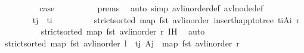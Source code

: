 \begin{isabellebody}
\ \ \ \ \ \ \isamarkupfalse%
\ \isamarkupfalse%
\ {\isacharquery}{\kern0pt}case\isanewline
\ \ \ \ \ \ \ \ \isamarkupfalse%
\ {\isachardoublequoteopen}{}{\isachardot}{\kern0pt}prems{\isachardoublequoteclose}\ \isamarkupfalse%
\ {\isacharparenleft}{\kern0pt}auto\ simp{\isacharcolon}{\kern0pt}\ avl{\isacharunderscore}{\kern0pt}inorder{\isacharunderscore}{\kern0pt}def\ avl{\isacharunderscore}{\kern0pt}node{\isacharunderscore}{\kern0pt}def{\isacharparenright}{\kern0pt}\isanewline
\ \ \ \ \isamarkupfalse%
\isanewline
\ \ \ \ \ \ \isamarkupfalse%
\ {\isachardoublequoteopen}t\isactrlsub j\ {\isacharless}{\kern0pt}\ t\isactrlsub i{\isachardoublequoteclose}\isanewline
\ \ \ \ \ \ \isamarkupfalse%
\ \isamarkupfalse%
\ {\isachardoublequoteopen}strict{\isacharunderscore}{\kern0pt}sorted\ {\isacharparenleft}{\kern0pt}map\ fst\ {\isacharparenleft}{\kern0pt}avl{\isacharunderscore}{\kern0pt}inorder\ {\isacharparenleft}{\kern0pt}insert{\isacharunderscore}{\kern0pt}happ{\isacharunderscore}{\kern0pt}to{\isacharunderscore}{\kern0pt}tree\ {\isacharparenleft}{\kern0pt}t\isactrlsub i{\isacharcomma}{\kern0pt}A\isactrlsub i{\isacharparenright}{\kern0pt}\ r{\isacharparenright}{\kern0pt}{\isacharparenright}{\kern0pt}{\isacharparenright}{\kern0pt}{\isachardoublequoteclose}\isanewline
\ \ \ \ \ \ \ \ \isamarkupfalse%
\ {\isacartoucheopen}strict{\isacharunderscore}{\kern0pt}sorted\ {\isacharparenleft}{\kern0pt}map\ fst\ {\isacharparenleft}{\kern0pt}avl{\isacharunderscore}{\kern0pt}inorder\ r{\isacharparenright}{\kern0pt}{\isacharparenright}{\kern0pt}{\isacartoucheclose}\ {\isachardoublequoteopen}{}{\isachardot}{\kern0pt}IH{\isachardoublequoteclose}\ \isamarkupfalse%
\ auto\isanewline
\isanewline
\ \ \ \ \ \ \isamarkupfalse%
\ {\isachardoublequoteopen}strict{\isacharunderscore}{\kern0pt}sorted\ {\isacharparenleft}{\kern0pt}map\ fst\ {\isacharparenleft}{\kern0pt}avl{\isacharunderscore}{\kern0pt}inorder\ l\ {\isacharat}{\kern0pt}\ {\isacharbrackleft}{\kern0pt}{\isacharparenleft}{\kern0pt}t\isactrlsub j{\isacharcomma}{\kern0pt}\ A\isactrlsub j{\isacharparenright}{\kern0pt}{\isacharbrackright}{\kern0pt}{\isacharparenright}{\kern0pt}\ {\isacharat}{\kern0pt}\ map\ fst\ {\isacharparenleft}{\kern0pt}avl{\isacharunderscore}{\kern0pt}inorder\ r{\isacharparenright}{\kern0pt}{\isacharparenright}{\kern0pt}{\isachardoublequoteclose}\isanewline
\ \ \ \ \ \ \ \ \isamarkupfalse%

\end{isabellebody}
